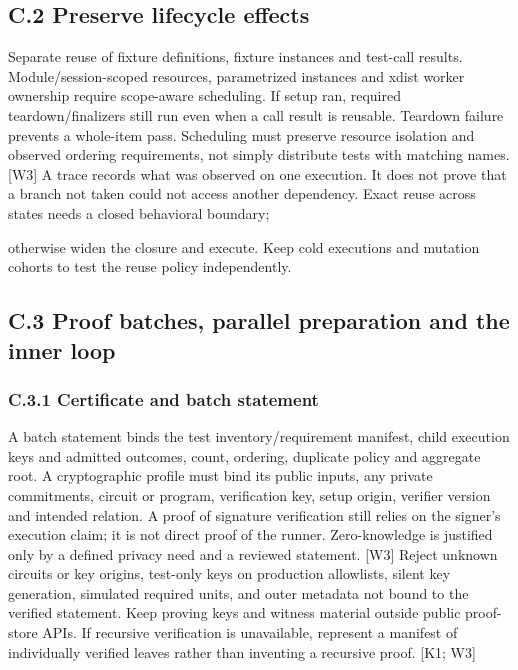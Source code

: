 \documentclass{article}
\begin{document}
\subsection*{C.2 Preserve lifecycle effects}

Separate reuse of fixture definitions, fixture instances and test-call results. Module/session-scoped
resources, parametrized instances and xdist worker ownership require scope-aware scheduling. If
setup ran, required teardown/finalizers still run even when a call result is reusable. Teardown failure
prevents a whole-item pass. Scheduling must preserve resource isolation and observed ordering
requirements, not simply distribute tests with matching names. [W3]
A trace records what was observed on one execution. It does not prove that a branch not taken
could not access another dependency. Exact reuse across states needs a closed behavioral boundary;


otherwise widen the closure and execute. Keep cold executions and mutation cohorts to test the reuse
policy independently.

\subsection*{C.3 Proof batches, parallel preparation and the inner loop}

\subsubsection*{C.3.1 Certificate and batch statement}

A batch statement binds the test inventory/requirement manifest, child execution keys and admitted
outcomes, count, ordering, duplicate policy and aggregate root. A cryptographic profile must bind its
public inputs, any private commitments, circuit or program, verification key, setup origin, verifier
version and intended relation. A proof of signature verification still relies on the signer’s execution
claim; it is not direct proof of the runner. Zero-knowledge is justified only by a defined privacy need
and a reviewed statement. [W3]
Reject unknown circuits or key origins, test-only keys on production allowlists, silent key generation,
simulated required units, and outer metadata not bound to the verified statement. Keep proving
keys and witness material outside public proof-store APIs. If recursive verification is unavailable,
represent a manifest of individually verified leaves rather than inventing a recursive proof. [K1; W3]
\end{document}
